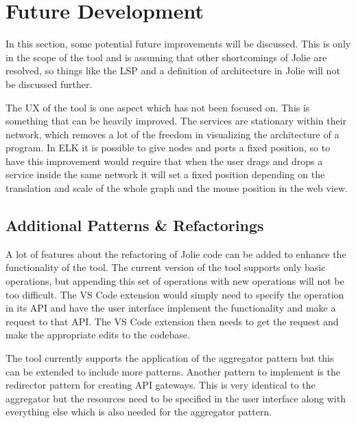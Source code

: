 \section{Future Development}
In this section, some potential future improvements will be discussed.
This is only in the scope of the tool and is assuming that other shortcomings of Jolie are resolved, so things like the LSP and a definition of architecture in Jolie will not be discussed further.

The UX of the tool is one aspect which has not been focused on. This is something that can be heavily improved.
The services are stationary within their network, which removes a lot of the freedom in visualizing the architecture of a program.
In ELK it is possible to give nodes and ports a fixed position, so to have this improvement would require that when the user drags and drops a service inside the same network it will set a fixed position depending on the translation and scale of the whole graph and the mouse position in the web view.

\subsection{Additional Patterns \& Refactorings}
A lot of features about the refactoring of Jolie code can be added to enhance the functionality of the tool.
The current version of the tool supports only basic operations, but appending this set of operations with new operations will not be too difficult. 
The VS Code extension would simply need to specify the operation in its API and have the user interface implement the functionality and make a request to that API.
The VS Code extension then needs to get the request and make the appropriate edits to the codebase.

The tool currently supports the application of the aggregator pattern but this can be extended to include
more patterns. Another pattern to implement is the redirector pattern for creating API gateways.
This is very identical to the aggregator but the resources need to be specified in the user interface along with everything else which is also needed for the aggregator pattern. 

